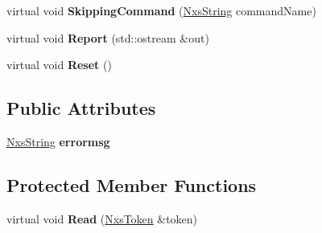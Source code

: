 \begin{DoxyCompactItemize}
\item 
\hypertarget{classNxsBlock_ad369f29d49db5f6bc0d9603571813cb5}{
virtual void {\bfseries SkippingCommand} (\hyperlink{classNxsString}{NxsString} commandName)}
\label{classNxsBlock_ad369f29d49db5f6bc0d9603571813cb5}

\item 
\hypertarget{classNxsBlock_a7c88492f921b9952381c57c59233a04f}{
virtual void {\bfseries Report} (std::ostream \&out)}
\label{classNxsBlock_a7c88492f921b9952381c57c59233a04f}

\item 
\hypertarget{classNxsBlock_a3642d732dd82298ef2f35a7b83b97719}{
virtual void {\bfseries Reset} ()}
\label{classNxsBlock_a3642d732dd82298ef2f35a7b83b97719}

\end{DoxyCompactItemize}
\subsection*{Public Attributes}
\begin{DoxyCompactItemize}
\item 
\hypertarget{classNxsBlock_a8d85c9a7d0e2958b5531a9b734bdc1ea}{
\hyperlink{classNxsString}{NxsString} {\bfseries errormsg}}
\label{classNxsBlock_a8d85c9a7d0e2958b5531a9b734bdc1ea}

\end{DoxyCompactItemize}
\subsection*{Protected Member Functions}
\begin{DoxyCompactItemize}
\item 
\hypertarget{classNxsBlock_a3b7a229312d9182c6a7a3823d0e46a69}{
virtual void {\bfseries Read} (\hyperlink{classNxsToken}{NxsToken} \&token)}
\label{classNxsBlock_a3b7a229312d9182c6a7a3823d0e46a69}

\end{DoxyCompactItemize}

